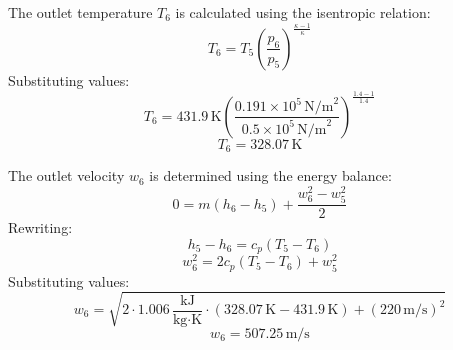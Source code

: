 The outlet temperature \( T_6 \) is calculated using the isentropic relation:  
\[
T_6 = T_5 \left( \frac{p_6}{p_5} \right)^{\frac{\kappa-1}{\kappa}}
\]  
Substituting values:  
\[
T_6 = 431.9 \, \text{K} \left( \frac{0.191 \times 10^5 \, \text{N/m}^2}{0.5 \times 10^5 \, \text{N/m}^2} \right)^{\frac{1.4-1}{1.4}}
\]  
\[
T_6 = 328.07 \, \text{K}
\]  

The outlet velocity \( w_6 \) is determined using the energy balance:  
\[
0 = m \left( h_6 - h_5 \right) + \frac{w_6^2 - w_5^2}{2}
\]  
Rewriting:  
\[
h_5 - h_6 = c_p \left( T_5 - T_6 \right)
\]  
\[
w_6^2 = 2 c_p \left( T_5 - T_6 \right) + w_5^2
\]  
Substituting values:  
\[
w_6 = \sqrt{2 \cdot 1.006 \, \frac{\text{kJ}}{\text{kg·K}} \cdot (328.07 \, \text{K} - 431.9 \, \text{K}) + (220 \, \text{m/s})^2}
\]  
\[
w_6 = 507.25 \, \text{m/s}
\]